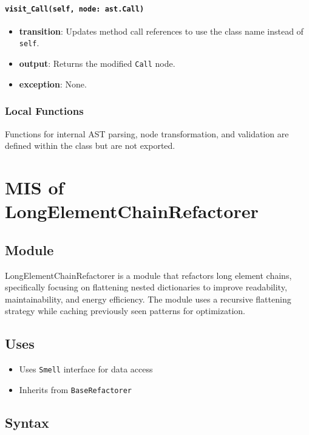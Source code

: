 \documentclass[12pt, titlepage]{article}
\begin{document}
\paragraph{\texttt{visit\_Call(self, node: ast.Call)}}
\begin{itemize}
  \item \textbf{transition}: Updates method call references to use the class name instead of \texttt{self}.
  \item \textbf{output}: Returns the modified \texttt{Call} node.
  \item \textbf{exception}: None.
\end{itemize}

\subsubsection{Local Functions}
Functions for internal AST parsing, node transformation, and validation are defined within the class but are not exported.
  
\newpage  

\section{MIS of LongElementChainRefactorer}

\subsection{Module}

LongElementChainRefactorer is a module that refactors long element chains, specifically focusing on flattening nested dictionaries to improve readability, maintainability, and energy efficiency. The module uses a recursive flattening strategy while caching previously seen patterns for optimization.

\subsection{Uses}

\begin{itemize}
    \item Uses \texttt{Smell} interface for data access
    \item Inherits from \texttt{BaseRefactorer}
\end{itemize}

\subsection{Syntax}
\end{document}
